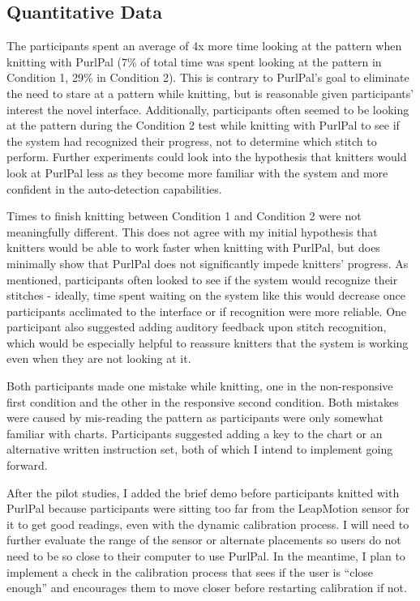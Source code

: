 \documentclass{article}
\begin{document}
\subsection{Quantitative Data}

The participants spent an average of 4x more time looking at the pattern when knitting with PurlPal (7\% of total time was spent looking at the pattern in Condition 1, 29\% in Condition 2).
This is contrary to PurlPal's goal to eliminate the need to stare at a pattern while knitting, but is reasonable given participants' interest the novel interface.
Additionally, participants often seemed to be looking at the pattern during the Condition 2 test while knitting with PurlPal to see if the system had recognized their progress, not to determine which stitch to perform.
Further experiments could look into the hypothesis that knitters would look at PurlPal less as they become more familiar with the system and more confident in the auto-detection capabilities.

Times to finish knitting between Condition 1 and Condition 2 were not meaningfully different. This does not agree with my initial hypothesis that knitters would be able to work faster when knitting with PurlPal, but does minimally show that PurlPal does not significantly impede knitters' progress.
As mentioned, participants often looked to see if the system would recognize their stitches - ideally, time spent waiting on the system like this would decrease once participants acclimated to the interface or if recognition were more reliable.
One participant also suggested adding auditory feedback upon stitch recognition, which would be especially helpful to reassure knitters that the system is working even when they are not looking at it.

Both participants made one mistake while knitting, one in the non-responsive first condition and the other in the responsive second condition.
Both mistakes were caused by mis-reading the pattern as participants were only somewhat familiar with charts.
Participants suggested adding a key to the chart or an alternative written instruction set, both of which I intend to implement going forward.

After the pilot studies, I added the brief demo before participants knitted with PurlPal because participants were sitting too far from the LeapMotion sensor for it to get good readings, even with the dynamic calibration process.
I will need to further evaluate the range of the sensor or alternate placements so users do not need to be so close to their computer to use PurlPal.
In the meantime, I plan to implement a check in the calibration process that sees if the user is ``close enough'' and encourages them to move closer before restarting calibration if not.
\end{document}
